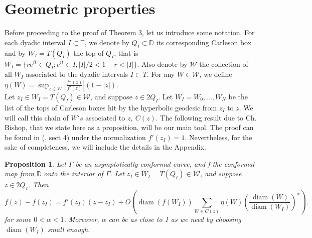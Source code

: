 \documentclass[12pt,a4paper]{article}
\newtheorem{propo}{Proposition}
\theoremstyle{definition}
\theoremstyle{remark}
\newcommand{\D}{\mathbb{D}}
\newcommand{\T}{\mathbb{T}}
\newcommand{\diam}{\operatorname{diam}}
\numberwithin{komcounter}{section}
\begin{document}
 \section{Geometric properties}
 Before proceeding to the proof of Theorem 3, let us introduce some notation. For each dyadic interval $I\subset \T$, we denote by $Q_I\subset\D$ its corresponding Carleson box and by $W_I=T(Q_I)$ the top of $Q_I$, that is $W_I=\{r e^{it}\in Q_I; e^{it}\in I, |I|/2 < 1-r <|I|\}$. Also denote by $\mathcal{W}$ the collection of all $W_I$ associated to the dyadic intervals $I\subset T$.
 For any $W\in \mathcal{W}$, we define $\eta(W)=\sup_{z\in W} |\frac{f''(z)}{f'(z)}| (1-|z|)$.\\
 Let $z_I \in W_I = T(Q_I) \in \mathcal{W}$, and suppose $ z \in 2Q_I$. Let $W_I = W_0, . . . ,W_N$
 be the list of the tops of Carleson  boxes hit by the hyperbolic geodesic from $z_I$ to $ z$. We will call this chain of $W's$ associated to $z, ~C(z)$.
 The following result due to Ch. Bishop, that we state here as a proposition, will be our main tool. The proof can be found in (\cite{b}, sect 4) under the normalization $f'(z_I)=1$. Nevertheless, for the sake of completeness, we will include the details in the Appendix.
 
 \begin{propo}Let $\Gamma$ be an asymptotically conformal curve, and f the conformal map from $\D$ onto the interior of $\Gamma$. Let $z_I \in W_I = T(Q_I) \in \mathcal{W}$, and suppose $ z \in 2Q_I$. Then
 	\begin{equation}\label{chain}
 	f(z)-f(z_I)=f'(z_I)(z-z_I)+O\left(\diam (f(W_I )) \sum_{W\in C(z)}
 	\eta(W) \left(\frac{\diam (W)} {\diam (W_I)}\right)^\alpha\right).
 	\end{equation}
 	for some $0<\alpha<1$. Moreover, $\alpha$ can be as close to 1 as we need by choosing  $\diam (W_I)$ small enough.
 \end{propo}
\end{document}
